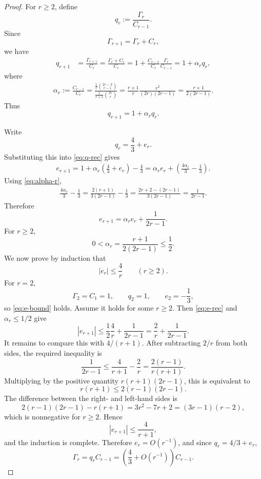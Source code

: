 \documentclass[10pt]{amsart}
\numberwithin{equation}{section}
\begin{document}
\begin{proof}
For $r\ge2$, define
\[
 q_r:=\frac{\Gamma_r}{C_{r-1}}.
\]
Since
\[
 \Gamma_{r+1}=\Gamma_r+C_r,
\]
we have
\begin{align*}
 q_{r+1}
 &=\frac{\Gamma_{r+1}}{C_r}
 =\frac{\Gamma_r+C_r}{C_r}
 =1+\frac{C_{r-1}}{C_r}\frac{\Gamma_r}{C_{r-1}}=1+\alpha_r q_r,
\end{align*}
where
\begin{align}
 \alpha_r
 :=\frac{C_{r-1}}{C_r}
 =\frac{\frac1r\binom{2r-2}{r-1}}
         {\frac1{r+1}\binom{2r}{r}}
 =\frac{r+1}{r}\frac{r^2}{(2r)(2r-1)}
 =\frac{r+1}{2(2r-1)}.
 \label{eq:alpha-r}
\end{align}
Thus
\begin{equation}\label{eq:q-rec}
 q_{r+1}=1+\alpha_rq_r.
\end{equation}

Write
\[
 q_r=\frac43+e_r.
\]
Substituting this into \cref{eq:q-rec} gives
\begin{align*}
 e_{r+1}
 =1+\alpha_r\left(\frac43+e_r\right)-\frac43
 =\alpha_re_r+\left(\frac{4\alpha_r}{3}-\frac13\right).
\end{align*}
Using \cref{eq:alpha-r},
\begin{align*}
 \frac{4\alpha_r}{3}-\frac13
 =\frac{2(r+1)}{3(2r-1)}-\frac13
 =\frac{2r+2-(2r-1)}{3(2r-1)}
 =\frac{1}{2r-1}.
\end{align*}
Therefore
\begin{equation}\label{eq:e-rec}
 e_{r+1}=\alpha_re_r+\frac{1}{2r-1}.
\end{equation}
For $r\ge2$,
\[
 0<\alpha_r=\frac{r+1}{2(2r-1)}\le\frac12.
\]
We now prove by induction that
\begin{equation}\label{eq:e-bound}
 |e_r|\le\frac4r\qquad(r\ge2).
\end{equation}
For $r=2$,
\[
 \Gamma_2=C_1=1,
 \qquad
 q_2=1,
 \qquad
 e_2=-\frac13,
\]
so \cref{eq:e-bound} holds.  Assume it holds for some $r\ge2$.  Then
\cref{eq:e-rec} and $\alpha_r\le1/2$ give
\[
 |e_{r+1}|
 \le\frac12\frac4r+\frac{1}{2r-1}
 =\frac2r+\frac{1}{2r-1}.
\]
It remains to compare this with $4/(r+1)$.  After subtracting $2/r$ from
both sides, the required inequality is
\[
 \frac{1}{2r-1}\le\frac4{r+1}-\frac2r
 =\frac{2(r-1)}{r(r+1)}.
\]
Multiplying by the positive quantity $r(r+1)(2r-1)$, this is equivalent to
\[
 r(r+1)\le2(r-1)(2r-1).
\]
The difference between the right- and left-hand sides is
\[
 2(r-1)(2r-1)-r(r+1)
 =3r^2-7r+2
 =(3r-1)(r-2),
\]
which is nonnegative for $r\ge2$.  Hence
\[
 |e_{r+1}|\le\frac4{r+1},
\]
and the induction is complete.  Therefore $e_r=O(r^{-1})$, and since
$q_r=4/3+e_r$,
\[
 \Gamma_r=q_rC_{r-1}
 =\left(\frac43+O(r^{-1})\right)C_{r-1}.
\]
\end{proof}
\end{document}
